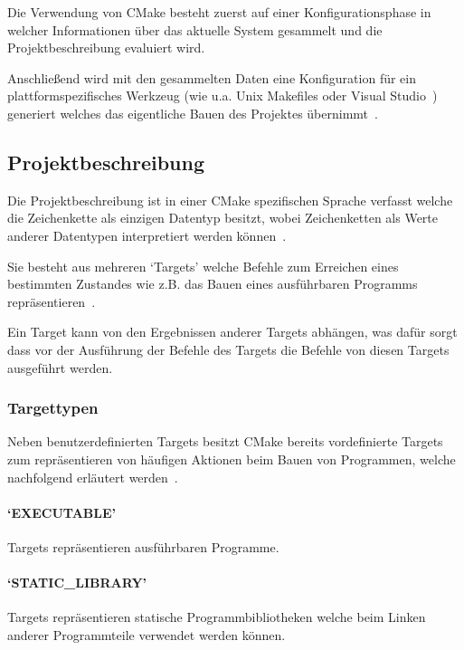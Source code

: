 \documentclass[german,proseminar,hyperref,utf8]{zihpub}
\begin{document}
    Die Verwendung von CMake besteht zuerst auf einer Konfigurationsphase in welcher Informationen
    über das aktuelle System gesammelt und die Projektbeschreibung evaluiert wird.

    Anschlie{\ss}end wird mit den gesammelten Daten eine Konfiguration für ein plattformspezifisches Werkzeug
    (wie u.a. Unix Makefiles oder Visual Studio~)
    generiert welches das eigentliche Bauen des Projektes
    übernimmt~.

    \subsection{Projektbeschreibung}
    Die Projektbeschreibung ist in einer CMake spezifischen Sprache verfasst welche die Zeichenkette
    als einzigen Datentyp besitzt, wobei Zeichenketten als Werte anderer Datentypen interpretiert
    werden können~.

    Sie besteht aus mehreren `Targets' welche Befehle zum Erreichen eines bestimmten Zustandes wie
    z.B. das Bauen eines ausführbaren Programms repräsentieren~.

    Ein Target kann von den Ergebnissen anderer Targets abhängen, was dafür sorgt dass vor der
    Ausführung der Befehle des Targets die Befehle von diesen Targets ausgeführt werden.

    \subsubsection{Targettypen}
    Neben benutzerdefinierten Targets besitzt CMake bereits vordefinierte Targets zum repräsentieren
    von häufigen Aktionen beim Bauen von Programmen, welche nachfolgend erläutert
    werden~.

    \paragraph{`EXECUTABLE'} Targets repräsentieren ausführbaren Programme.

    \paragraph{`STATIC\_LIBRARY'} Targets repräsentieren statische Programmbibliotheken welche
    beim Linken anderer Programmteile verwendet werden können.
\end{document}
